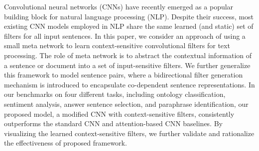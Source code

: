 Convolutional neural networks (CNNs) have recently emerged as a popular building block for natural language processing (NLP). Despite their success, most existing CNN models employed in NLP share the  same learned (and static) set of filters for all input sentences. In this paper, we consider an approach of using a small meta network to learn context-sensitive convolutional filters for text processing. The role of meta network is to abstract the contextual information of a sentence or document into a set of input-sensitive filters. We further generalize this framework to model sentence pairs, where a bidirectional filter generation mechanism is introduced to encapsulate co-dependent sentence representations.  In our benchmarks on four different tasks,  including ontology classification, sentiment analysis, answer sentence selection, and paraphrase identification, our proposed model, a modified CNN with context-sensitive filters, consistently outperforms the standard CNN and attention-based CNN baselines. By visualizing the learned context-sensitive filters, we further validate and rationalize the effectiveness of proposed framework.
